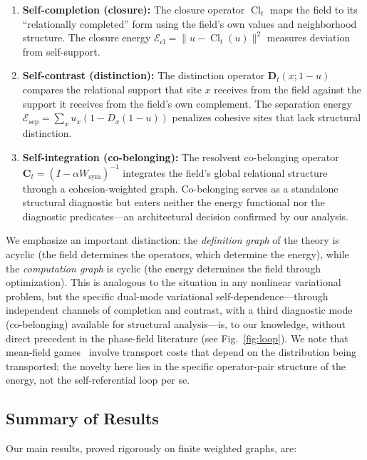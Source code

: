 \documentclass[lettersize,journal]{IEEEtran}
\DeclareMathOperator{\Cl}{Cl}
\begin{document}
\begin{enumerate}
\item \textbf{Self-completion (closure):} The closure operator $\Cl_t$ maps the field to its ``relationally completed'' form using the field's own values and neighborhood structure. The closure energy $\mathcal{E}_{\mathrm{cl}} = \|u - \Cl_t(u)\|^2$ measures deviation from self-support.

\item \textbf{Self-contrast (distinction):} The distinction operator $\mathbf{D}_t(x; 1-u)$ compares the relational support that site $x$ receives from the field against the support it receives from the field's own complement. The separation energy $\mathcal{E}_{\mathrm{sep}} = \sum_x u_x(1 - D_x(1-u))$ penalizes cohesive sites that lack structural distinction.

\item \textbf{Self-integration (co-belonging):} The resolvent co-belonging operator $\mathbf{C}_t = (I - \alpha W_{\mathrm{sym}})^{-1}$ integrates the field's global relational structure through a cohesion-weighted graph. Co-belonging serves as a standalone structural diagnostic but enters neither the energy functional nor the diagnostic predicates---an architectural decision confirmed by our analysis.
\end{enumerate}

We emphasize an important distinction: the \emph{definition graph} of the theory is acyclic (the field determines the operators, which determine the energy), while the \emph{computation graph} is cyclic (the energy determines the field through optimization). This is analogous to the situation in any nonlinear variational problem, but the specific dual-mode variational self-dependence---through independent channels of completion and contrast, with a third diagnostic mode (co-belonging) available for structural analysis---is, to our knowledge, without direct precedent in the phase-field literature (see Fig.~\ref{fig:loop}). We note that mean-field games~\cite{LasryLions2007} involve transport costs that depend on the distribution being transported; the novelty here lies in the specific operator-pair structure of the energy, not the self-referential loop per se.

\subsection{Summary of Results}

Our main results, proved rigorously on finite weighted graphs, are:
\end{document}
